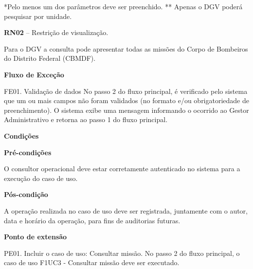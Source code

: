       *Pelo menos um dos parâmetros deve ser preenchido.
      ** Apenas o DGV poderá pesquisar por unidade.
   
   \textbf{RN02} – Restrição de visualização.
   
   Para o DGV a consulta pode apresentar todas as missões do Corpo de Bombeiros do Distrito Federal (CBMDF).
   
   {\raggedright
      \textbf{Fluxo de Exceção}
   }
   
   FE01. Validação de dados
	No passo 2 do fluxo principal, é verificado pelo sistema que um ou mais campos não foram validados (no formato e/ou
	obrigatoriedade de preenchimento). O sistema exibe uma mensagem informando o ocorrido ao Gestor Administrativo e retorna
	ao passo 1 do fluxo principal.

	
   {\raggedright
      \textbf{Condições}
   }
   
    
   \textbf{Pré-condições}
   
   O consultor operacional deve estar corretamente autenticado no sistema para a execução do caso de uso.
   
   \textbf{Pós-condição}
   
   A operação realizada no caso de uso deve ser registrada, juntamente com o autor, data e horário da operação, para fins de auditorias futuras.
   
   \textbf{Ponto de extensão}
   
   PE01. Incluir o caso de uso: Consultar missão.
   No passo 2 do fluxo principal, o caso de uso F1UC3 - Consultar missão deve ser executado.